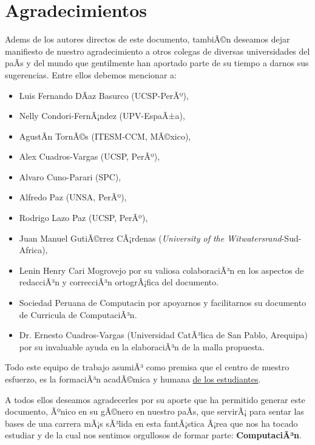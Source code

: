 \chapter*{Agradecimientos}\label{chap:cs-ack}
%

Adem s de los autores directos de este documento, tambiÃ©n deseamos dejar manifiesto de nuestro 
agradecimiento a otros colegas de diversas universidades del paÃ­s y del mundo que gentilmente 
han aportado parte de su tiempo a darnos sus sugerencias. Entre ellos debemos mencionar a:

\begin{itemize}
\item Luis Fernando DÃ­az Basurco (UCSP-PerÃº), 
\item Nelly Condori-FernÃ¡ndez (UPV-EspaÃ±a), 
\item AgustÃ­n TornÃ©s (ITESM-CCM, MÃ©xico), 
\item Alex Cuadros-Vargas (UCSP, PerÃº),
\item Alvaro Cuno-Parari (SPC),
\item Alfredo Paz (UNSA, PerÃº), 
\item Rodrigo Lazo Paz (UCSP, PerÃº),
\item Juan Manuel GutiÃ©rrez CÃ¡rdenas (\textit{University of the Witwatersrand}-Sud-Africa),
\item Lenin Henry Cari Mogrovejo por su valiosa colaboraciÃ³n en los aspectos de redacciÃ³n y correcciÃ³n ortogrÃ¡fica del documento.

\item Sociedad Peruana de Computaci n por apoyarnos y facilitarnos su documento de Curricula de ComputaciÃ³n.
\item Dr. Ernesto Cuadros-Vargas (Universidad CatÃ³lica de San Pablo, Arequipa) por su invaluable ayuda en la elaboraciÃ³n de la malla propuesta. 
\end{itemize}

Todo este equipo de trabajo asumiÃ³ como premisa que el centro de nuestro esfuerzo, 
es la formaciÃ³n acadÃ©mica y humana \underline{de los estudiantes}.

A todos ellos deseamos agradecerles por su aporte que ha permitido generar 
este documento, Ãºnico en su gÃ©nero en nuestro paÃ­s, que servirÃ¡ para sentar las 
bases de una carrera mÃ¡s sÃ³lida en esta fantÃ¡stica Ã¡rea que nos ha tocado estudiar y 
de la cual nos sentimos orgullosos de formar parte: \textbf{ComputaciÃ³n}.
